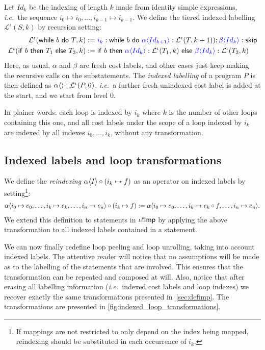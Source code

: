 \documentclass[submission,copyright,creativecommons]{eptcs}
\theoremstyle{definition}
\newcommand{\s}[1]{{\sf #1}}    \newcommand{\vc}[1]{{\bf #1}}
\newcommand{\imp}{{\sf Imp}}            \newcommand{\vm}{{\sf Vm}}              \newcommand{\mips}{{\sf Mips}}          \newcommand{\Clight}{{\sf Clight}}        \newcommand{\Cminor}{{\sf Cminor}}
\newcommand{\sop}[1]{\s{#1}\ }
\newcommand{\sbin}[1]{\ \s{#1}\ }
\newcommand{\Ell}{\mathcal L}
\newcommand{\ass}{\mathrel{:=}}
\newcommand{\ie}{\emph{i.e.\ }}
\def\lbl#1:{\mbox{\color{blue}$#1$}:}
\begin{document}
Let $Id_k$ be the indexing of length $k$ made from identity simple expressions,
\ie the sequence $i_0\mapsto i_0, \ldots , i_{k-1}\mapsto i_{k-1}$.
We define the tiered indexed labelling $\Ell^\iota (S,k)$ by recursion setting:
\begin{align*}
\Ell^\iota(\sop{while}b\sbin{do}T, k)
&\ass \lbl{i_k}:\sop{while}b\sbin{do}\lbl{\alpha\la Id_{k+1}\ra}: \Ell^\iota(T,k+1));\lbl{\beta\la Id_k \ra}: \s{skip}\\
\Ell^\iota(\sop{if}b\sbin{then}T_1\sbin{else}T_2, k)
&\ass \sop{if}b\sbin{then} \lbl{\alpha\la Id_k \ra} : \Ell^\iota(T_1,k) \sbin{else} \lbl{\beta\la Id_k \ra} : \Ell^\iota(T_2,k)
\end{align*}
Here, as usual, $\alpha$ and $\beta$ are fresh cost labels, and other cases just keep making the recursive calls on the substatements.
The \emph{indexed labelling} of a program $P$ is then defined as $\alpha\la \ra : \Ell^\iota(P,0)$, \ie a further fresh unindexed cost label is added at the start, and we start from level $0$.

In plainer words: each loop is indexed by $i_k$ where $k$ is the number of other loops containing this one, and all cost labels under the scope of a loop indexed by $i_k$ are indexed by all indexes $i_0,\ldots,i_k$, without any transformation.

\subsection{Indexed labels and loop transformations}\label{ssec2}
We define the \emph{reindexing} $\alpha\langle I\rangle\circ (i_k\mapsto f)$ as an operator on indexed labels by setting\footnote{If mappings are not restricted to only depend on the index being mapped,
    reindexing should be substituted in each occurrence of $i_k$.}:
\begin{multline*}
\alpha \la i_0\mapsto e_0,\ldots, i_k \mapsto e_k,\ldots,i_n\mapsto e_n\ra
\circ(i_k\mapsto f)
\ass \alpha \la i_0\mapsto e_0,\ldots, i_k \mapsto e_k \circ f,\ldots,i_n\mapsto e_n \ra.
\end{multline*}
We extend this definition to statements in $\iota\ell\imp$
by applying the above transformation to all indexed labels contained in a statement.

We can now finally redefine loop peeling and loop unrolling, taking into account indexed labels.
The attentive reader will notice that no assumptions will be made as to the
labelling of the statements that are involved.
This ensures that the transformation can be repeated and composed at will.
Also, notice that after erasing all labelling information (\ie indexed cost labels and loop indexes) we recover exactly the same transformations presented in~\autoref{sec:defimp}. The transformations
are presented in \autoref{fig:indexed_loop_transformations}.
\end{document}
